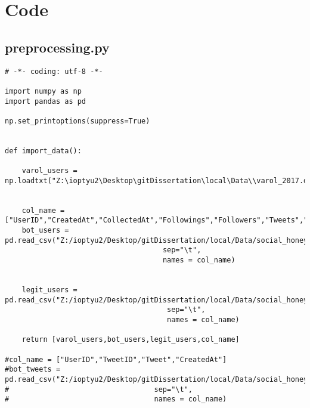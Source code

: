 
\chapter{Code} %

\label{AppendixA} %

\section{preprocessing.py}
\begin{lstlisting}
# -*- coding: utf-8 -*-

import numpy as np
import pandas as pd

np.set_printoptions(suppress=True)


def import_data():

    varol_users = np.loadtxt("Z:\ioptyu2\Desktop\gitDissertation\local\Data\\varol_2017.dat")


    col_name = ["UserID","CreatedAt","CollectedAt","Followings","Followers","Tweets","NameLength","BioLength"]
    bot_users = pd.read_csv("Z:/ioptyu2/Desktop/gitDissertation/local/Data/social_honeypot_icwsm_2011/content_polluters.txt",
                                     sep="\t",
                                     names = col_name)


    legit_users = pd.read_csv("Z:/ioptyu2/Desktop/gitDissertation/local/Data/social_honeypot_icwsm_2011/legitimate_users.txt",
                                      sep="\t",
                                      names = col_name)
    
    return [varol_users,bot_users,legit_users,col_name]

#col_name = ["UserID","TweetID","Tweet","CreatedAt"]
#bot_tweets = pd.read_csv("Z:/ioptyu2/Desktop/gitDissertation/local/Data/social_honeypot_icwsm_2011/content_polluters_tweets.txt",
#                                  sep="\t",
#                                  names = col_name)

\end{lstlisting}


